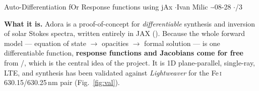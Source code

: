 


%
{Auto-Differentiation fOr Response functions using jAx \quad$\cdot$\quad Ivan Milic \quad$\cdot$-08-28 \quad$\cdot$/3}

\textbf{What it is.} Adora is a proof-of-concept for \emph{differentiable} synthesis and inversion of solar
Stokes spectra, written entirely in JAX (). Because the whole forward model --- equation of
state $\to$ opacities $\to$ formal solution --- is one differentiable function, \textbf{response functions
and Jacobians come for free} from /, which is the central idea of the project.
It is 1D plane-parallel, single-ray, LTE, and synthesis has been validated against \emph{Lightweaver} for the
Fe\,\textsc{i} 630.15/630.25\,nm pair (Fig.~\ref{fig:val}).

